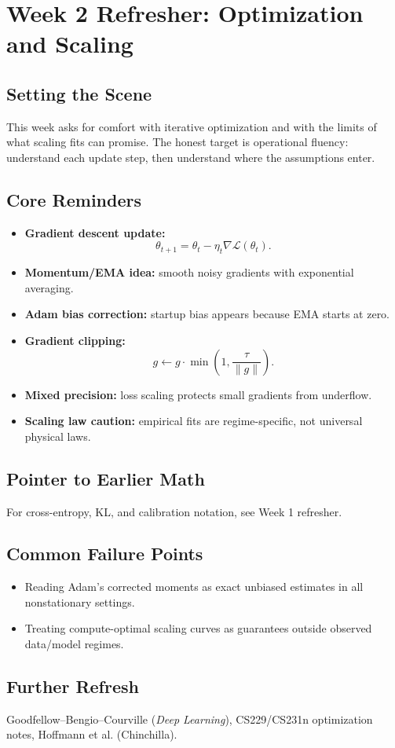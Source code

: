 \section{Week 2 Refresher: Optimization and Scaling}

\subsection*{Setting the Scene}
This week asks for comfort with iterative optimization and with the limits of what scaling fits can promise. The honest target is operational fluency: understand each update step, then understand where the assumptions enter.

\subsection*{Core Reminders}
\begin{itemize}[leftmargin=1.5em]
  \item \textbf{Gradient descent update:}
  \[
    \theta_{t+1}=\theta_t-\eta_t \nabla \mathcal{L}(\theta_t).
  \]
  \item \textbf{Momentum/EMA idea:} smooth noisy gradients with exponential averaging.
  \item \textbf{Adam bias correction:} startup bias appears because EMA starts at zero.
  \item \textbf{Gradient clipping:}
  \[
    g \leftarrow g \cdot \min\left(1,\frac{\tau}{\|g\|}\right).
  \]
  \item \textbf{Mixed precision:} loss scaling protects small gradients from underflow.
  \item \textbf{Scaling law caution:} empirical fits are regime-specific, not universal physical laws.
\end{itemize}

\subsection*{Pointer to Earlier Math}
For cross-entropy, KL, and calibration notation, see Week 1 refresher.

\subsection*{Common Failure Points}
\begin{itemize}[leftmargin=1.5em]
  \item Reading Adam's corrected moments as exact unbiased estimates in all nonstationary settings.
  \item Treating compute-optimal scaling curves as guarantees outside observed data/model regimes.
\end{itemize}

\subsection*{Further Refresh}
Goodfellow--Bengio--Courville (\emph{Deep Learning}), CS229/CS231n optimization notes, Hoffmann et al. (Chinchilla).
